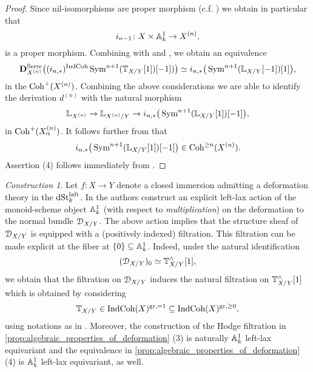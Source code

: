\documentclass[10pt,a4paper,reqno]{amsart} %
\theoremstyle{plain}
\theoremstyle{definition}
\theoremstyle{remark}
\numberwithin{equation}{section}
\newtheorem{construction}[thm]{Construction}
\begin{document}
\begin{proof}
    Since nil-isomorphisms are proper morphism (c.f. \cite[\href{https://stacks.math.columbia.edu/tag/0CYK}{Tag 0CYK}]{stacks-project}) we obtain in particular that 
        \[i_{n-1} \colon X \times \mathbb A^1_k \to X^{(n)},\]
    is a proper morphism. Combining \cite[Corollary 9.5.9 (b)]{Gaitsgory_IndCoh} with \cite[Proposition 3.1.3]{Gaitsgory_IndCoh} and \cite[Corollary 1.4.4.2]{Gaitsgory_Study_II}, we obtain
    an equivalence
        \[
            \mathbf D^{\mathrm{Serre}}_{X^{(n)}} \big( (i_{n, *})^{\mathrm{IndCoh}}  \operatorname{Sym}^{n+1}(\mathbb T_{X/ Y}[1])[-1]) \big) \simeq i_{n, *} \big( \operatorname{Sym}^{n+1}(\mathbb L_{X/ Y}[-1])[1] \big),
        \]
    in the \infcat $\mathrm{Coh}^+(X^{(n)})$. Combining the above considerations we are able to identify the derivation $d^{(n)}$ with the natural morphism
        \[
            \mathbb L_{X^{(n)}} \to \mathbb L_{X^{(n)}/ Y} \to i_{n, *} \big( \operatorname{Sym}^{n+1}(\mathbb L_{X/ Y}[1])[-1] \big),
        \]
    in $\mathrm{Coh}^+(X_\alpha^{(n)})$. It follows further from \cite[Lemma 5.36]{Porta_Yu_Representability} that
        \[i_{n, *} \big( \operatorname{Sym}^{n+1}(\mathbb L_{X/ Y}[1])[-1] \big) \in \mathrm{Coh}^{\ge n}(X^{(n)}).\]
    Assertion (4) follows immediately from \cite[\S 9, Proposition 5.2.2]{Gaitsgory_Study_II}.
\end{proof}

\begin{construction}
    Let $f \colon X \to Y$ denote a closed immersion admitting a deformation theory in the \infcat $\mathrm{dSt}_k^{\mathrm{laft}}$. In \cite[\S 9.2.5]{Gaitsgory_Study_II} the authors
    construct an explicit left-lax action of the monoid-scheme object $\mathbb A^1_k$ (with respect to \emph{multiplication})
    on the deformation to the normal bundle $\mathcal D_{X/ Y}$. The above action
    implies that the structure sheaf of $\mathcal D_{X/ Y}$ is equipped with a (positively indexed) filtration. This filtration
    can be made explicit at the fiber at $\{0 \} \subseteq \mathbb A^1_k$. Indeed, under the natural identification
        \[
            (\mathcal D_{X/ Y})_0 \simeq \mathbb T_{X/ Y}^\wedge[1] ,
        \]
    we obtain that the filtration on $\mathcal D_{X/ Y}$ induces the natural filtration on $\mathbb T_{X/ Y}^\wedge[1]$ which is obtained by considering
        \[
            \mathbb T_{X/ Y}  \in \mathrm{Ind}\mathrm{Coh}(X)^{\mathrm{gr}, =1} \subseteq \mathrm{Ind}\mathrm{Coh}(X)^{\mathrm{gr}, \ge 0},
        \]
    using notations as in \cite[\S 9.2.5.2]{Gaitsgory_Study_II}. Moreover, the construction of the Hodge filtration in \cref{prop:algebraic_properties_of_deformation} (3)
    is naturally $\mathbb A^1_k$ left-lax equivariant and the equivalence in \cref{prop:algebraic_properties_of_deformation} (4) is $\mathbb A^1_k$ left-lax equivariant, as well.
\end{construction}
\end{document}
